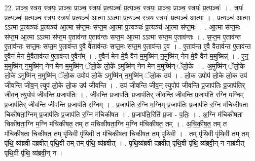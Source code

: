 \documentclass[17pt]{extarticle}
\begin{document}
22. प्राञ्च॒ स्त्रय॒ स्त्रयः॒ प्राञ्चः॒ प्राञ्च॒ स्त्रयः॑ प्र॒त्यञ्चः॑ प्र॒त्यञ्च॒ स्त्रयः॒ प्राञ्चः॒ प्राञ्च॒ स्त्रयः॑ प्र॒त्यञ्चः॑ । . त्रयः॑ प्र॒त्यञ्चः॑ प्र॒त्यञ्च॒ स्त्रय॒ स्त्रयः॑ प्र॒त्यञ्च॑ आ॒त्मा ऽऽत्मा प्र॒त्यञ्च॒ स्त्रय॒ स्त्रयः॑ प्र॒त्यञ्च॑ आ॒त्मा । . प्र॒त्यञ्च॑ आ॒त्मा ऽऽत्मा प्र॒त्यञ्चः॑ प्र॒त्यञ्च॑ आ॒त्मा स॑प्त॒मः स॑प्त॒म आ॒त्मा प्र॒त्यञ्चः॑ प्र॒त्यञ्च॑ आ॒त्मा स॑प्त॒मः । . आ॒त्मा स॑प्त॒मः स॑प्त॒म आ॒त्मा ऽऽत्मा स॑प्त॒म ए॒ताव॑न्त ए॒ताव॑न्तः सप्त॒म आ॒त्मा ऽऽत्मा स॑प्त॒म ए॒ताव॑न्तः । . स॒प्त॒म ए॒ताव॑न्त ए॒ताव॑न्तः सप्त॒मः स॑प्त॒म ए॒ताव॑न्त ए॒वै वैताव॑न्तः सप्त॒मः स॑प्त॒म ए॒ताव॑न्त ए॒व । . ए॒ताव॑न्त ए॒वै वैताव॑न्त ए॒ताव॑न्त ए॒वैन॑ मेन मे॒वैताव॑न्त ए॒ताव॑न्त ए॒वैन᳚म् । . ए॒वैन॑ मेन मे॒वै वैन॑ म॒मुष्मि॑न् न॒मुष्मि॑न् नेन मे॒वै वैन॑ म॒मुष्मिन्न्॑ । . ए॒न॒ म॒मुष्मि॑न् न॒मुष्मि॑न् नेन मेन म॒मुष्मि॑न् ॅलो॒के लो॒के॑ ऽमुष्मि॑न् नेन मेन म॒मुष्मि॑न् ॅलो॒के । . अ॒मुष्मि॑न् ॅलो॒के लो॒के॑ ऽमुष्मि॑न् न॒मुष्मि॑न् ॅलो॒क उपोप॑ लो॒के॑ ऽमुष्मि॑न् न॒मुष्मि॑न् ॅलो॒क उप॑ । . लो॒क उपोप॑ लो॒के लो॒क उप॑ जीवन्ति जीव॒न् त्युप॑ लो॒के लो॒क उप॑ जीवन्ति । . उप॑ जीवन्ति जीव॒न् त्युपोप॑ जीवन्ति प्र॒जाप॑तिः प्र॒जाप॑तिर् जीव॒न् त्युपोप॑ जीवन्ति प्र॒जाप॑तिः । . जी॒व॒न्ति॒ प्र॒जाप॑तिः प्र॒जाप॑तिर् जीवन्ति जीवन्ति प्र॒जाप॑ति र॒ग्नि म॒ग्निम् प्र॒जाप॑तिर् जीवन्ति जीवन्ति प्र॒जाप॑ति र॒ग्निम् । . प्र॒जाप॑ति र॒ग्नि म॒ग्निम् प्र॒जाप॑तिः प्र॒जाप॑ति र॒ग्नि म॑चिकीषता चिकीषता॒ग्निम् प्र॒जाप॑तिः प्र॒जाप॑ति र॒ग्नि म॑चिकीषत । . प्र॒जाप॑ति॒रिति॑ प्र॒जा - प॒तिः॒ । . अ॒ग्नि म॑चिकीषता चिकीषता॒ग्नि म॒ग्नि म॑चिकीषत॒ तम् त म॑चिकीषता॒ग्नि म॒ग्नि म॑चिकीषत॒ तम् । . अ॒चि॒की॒ष॒त॒ तम् त म॑चिकीषता चिकीषत॒ तम् पृ॑थि॒वी पृ॑थि॒वी त म॑चिकीषता चिकीषत॒ तम् पृ॑थि॒वी । . तम् पृ॑थि॒वी पृ॑थि॒वी तम् तम् पृ॑थि॒ व्य॑ब्रवी दब्रवीत् पृथि॒वी तम् तम् पृ॑थि॒ व्य॑ब्रवीत् । . पृ॒थि॒व्य॑ब्रवी दब्रवीत् पृथि॒वी पृ॑थि॒ व्य॑ब्रवी॒न् न नाब्र॑वीत् पृथि॒वी पृ॑थि॒ व्य॑ब्रवी॒न् न । \newline
\end{document}
